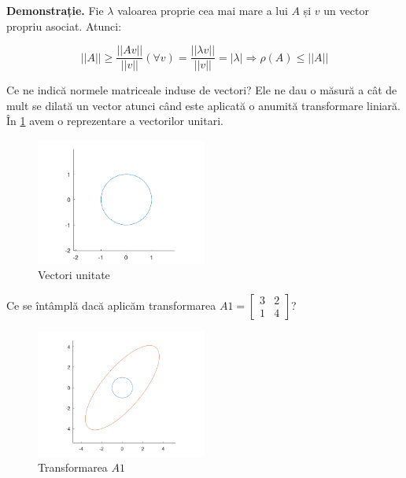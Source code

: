 \documentclass{exam}
\begin{document}
\par \textbf{Demonstrație.} Fie $\lambda$ valoarea proprie cea mai mare a lui $A$ și $v$ un vector propriu asociat. Atunci:

\begin{equation*}
	||A|| \geq \frac{||Av||}{||v||} (\forall v) = \frac{||\lambda v||}{||v||} = |\lambda| \Rightarrow \rho(A) \leq ||A||
\end{equation*}

\par Ce ne indică normele matriceale induse de vectori? Ele ne dau o măsură a
cât de mult se dilată un vector atunci când este aplicată o anumită transformare
liniară. În \ref{fig:1} avem o reprezentare a vectorilor unitari.

\begin{figure}[ht]
	\centering
	\includegraphics[width=0.5\textwidth]{plot1}
	\caption{Vectori unitate}
	\label{fig:1}
\end{figure}

\newpage
\par Ce se întâmplă dacă aplicăm transformarea $A1 = \begin{bmatrix} 3 & 2 \\ 1 & 4 \end{bmatrix}$?

\begin{figure}[ht]
	\centering
	\includegraphics[width=0.5\textwidth]{plot2}
	\caption{Transformarea $A1$}
	\label{fig:2}
\end{figure}
\end{document}
